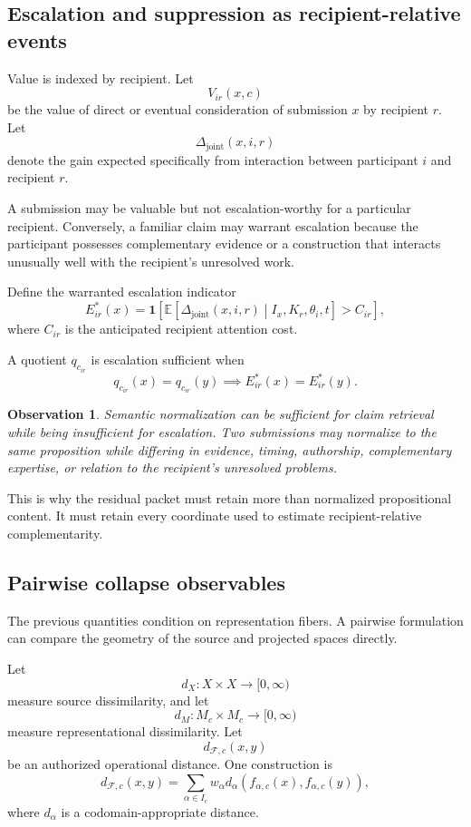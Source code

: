 \documentclass[11pt]{article}
\newtheorem{observation}[definition]{Observation}
\theoremstyle{definition}
\newcommand{\E}{\mathbb{E}}
\newcommand{\F}{\mathcal{F}}
\newcommand{\ind}{\mathbf{1}}
\begin{document}
\subsection{Escalation and suppression as recipient-relative events}

Value is indexed by recipient. Let
\[
V_{ir}(x,c)
\]
be the value of direct or eventual consideration of submission \(x\) by recipient \(r\). Let
\[
\Delta_{\mathrm{joint}}(x,i,r)
\]
denote the gain expected specifically from interaction between participant \(i\) and recipient \(r\).

A submission may be valuable but not escalation-worthy for a particular recipient. Conversely, a familiar claim may warrant escalation because the participant possesses complementary evidence or a construction that interacts unusually well with the recipient's unresolved work.

Define the warranted escalation indicator
\[
E_{ir}^{*}(x)
=
\ind
\left[
\E\left[
\Delta_{\mathrm{joint}}(x,i,r)
\middle|
I_x,K_r,\theta_i,t
\right]
>
C_{ir}
\right],
\]
where \(C_{ir}\) is the anticipated recipient attention cost.

A quotient \(q_{c_{ir}}\) is escalation sufficient when
\[
q_{c_{ir}}(x)=q_{c_{ir}}(y)
\implies
E_{ir}^{*}(x)=E_{ir}^{*}(y).
\]

\begin{observation}
Semantic normalization can be sufficient for claim retrieval while being insufficient for escalation. Two submissions may normalize to the same proposition while differing in evidence, timing, authorship, complementary expertise, or relation to the recipient's unresolved problems.
\end{observation}

This is why the residual packet must retain more than normalized propositional content. It must retain every coordinate used to estimate recipient-relative complementarity.

\subsection{Pairwise collapse observables}

The previous quantities condition on representation fibers. A pairwise formulation can compare the geometry of the source and projected spaces directly.

Let
\[
d_X:X\times X\to[0,\infty)
\]
measure source dissimilarity, and let
\[
d_M:M_c\times M_c\to[0,\infty)
\]
measure representational dissimilarity. Let
\[
d_{\F,c}(x,y)
\]
be an authorized operational distance. One construction is
\[
d_{\F,c}(x,y)
=
\sum_{\alpha\in I_c}
w_\alpha
d_\alpha
\left(
f_{\alpha,c}(x),
f_{\alpha,c}(y)
\right),
\]
where \(d_\alpha\) is a codomain-appropriate distance.
\end{document}
